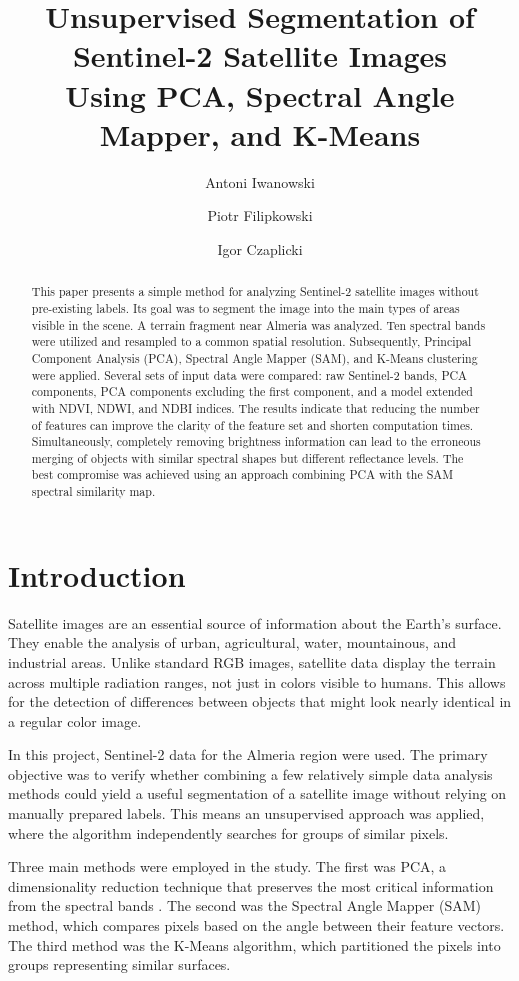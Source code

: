\documentclass[12pt,a4paper]{article}
\title{
    Unsupervised Segmentation of Sentinel-2 Satellite Images\\
    Using PCA, Spectral Angle Mapper, and K-Means
}
\author{
    Antoni Iwanowski \and
    Piotr Filipkowski \and
    Igor Czaplicki
}
\date{}
\begin{document}
    \maketitle

    \begin{abstract}
       This paper presents a simple method for analyzing Sentinel-2 satellite images without pre-existing labels. Its goal was to segment the image into the main types of areas visible in the scene. A terrain fragment near Almeria was analyzed. Ten spectral bands were utilized and resampled to a common spatial resolution. Subsequently, Principal Component Analysis (PCA), Spectral Angle Mapper (SAM), and K-Means clustering were applied. Several sets of input data were compared: raw Sentinel-2 bands, PCA components, PCA components excluding the first component, and a model extended with NDVI, NDWI, and NDBI indices. The results indicate that reducing the number of features can improve the clarity of the feature set and shorten computation times. Simultaneously, completely removing brightness information can lead to the erroneous merging of objects with similar spectral shapes but different reflectance levels. The best compromise was achieved using an approach combining PCA with the SAM spectral similarity map.
    \end{abstract}

    \section{Introduction}

    Satellite images are an essential source of information about the Earth's surface. They enable the analysis of urban, agricultural, water, mountainous, and industrial areas. Unlike standard RGB images, satellite data display the terrain across multiple radiation ranges, not just in colors visible to humans. This allows for the detection of differences between objects that might look nearly identical in a regular color image.

    In this project, Sentinel-2 data for the Almeria region were used. The primary objective was to verify whether combining a few relatively simple data analysis methods could yield a useful segmentation of a satellite image without relying on manually prepared labels. This means an unsupervised approach was applied, where the algorithm independently searches for groups of similar pixels.

    Three main methods were employed in the study. The first was PCA, a dimensionality reduction technique that preserves the most critical information from the spectral bands \cite{malahat2024pca,deafricaPCA2021,kaluzna2020pca}. The second was the Spectral Angle Mapper (SAM) method, which compares pixels based on the angle between their feature vectors. The third method was the K-Means algorithm, which partitioned the pixels into groups representing similar surfaces.
\end{document}
